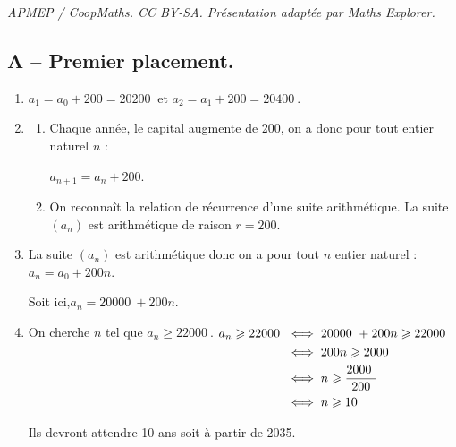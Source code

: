\documentclass[10pt]{article}
\providecommand{\euro}{\texteuro}
\providecommand{\np}[2][]{{#2~#1}}
\providecommand{\euro}{{\text{€}}}
\renewcommand{\euro}{\ifmmode\text{\texteuro}\else\texteuro\fi}
\begin{document}
\noindent\textit{APMEP / CoopMaths. CC BY-SA. Présentation adaptée par Maths Explorer.}\par\medskip
\subsection*{A -- Premier placement.}
	\begin{enumerate}
		\item $a_{1} = a_0+200 = \np{20200}$ \quad et \quad $a_{2} = a_1 +200 = \np{20400}$.

		\item \begin{enumerate}
			\item Chaque année, le capital augmente de 200\euro{}, on a donc pour tout entier naturel $n$ :

			$a_{n+1}=a_n+200$.

			\item On reconnaît la relation de récurrence d'une suite arithmétique. La suite $(a_n)$ est arithmétique de raison $r=200$.
		\end{enumerate}

		\item La suite $(a_n)$ est arithmétique donc on a pour tout $n$ entier naturel :\quad $a_n=a_0+200n$.

		Soit ici,\quad $a_n=\np{20000} +200n$.

		\item On cherche $n$ tel que $a_n \geqslant  \np{22000}$.\hspace*{2cm}
		$\begin{aligned}[t] a_n \geqslant  \np{22000} & \iff \np{20000} +200n \geqslant  \np{22000}\\
		 & \iff 200n \geqslant  \np{2000}\\
		 & \iff n \geqslant \dfrac{\np{2000}}{200} \vspace*{2mm}\\
		 & \iff n \geqslant  10
		\end{aligned}$

		Ils devront attendre 10 ans soit à partir de 2035.
	\end{enumerate}
\end{document}
